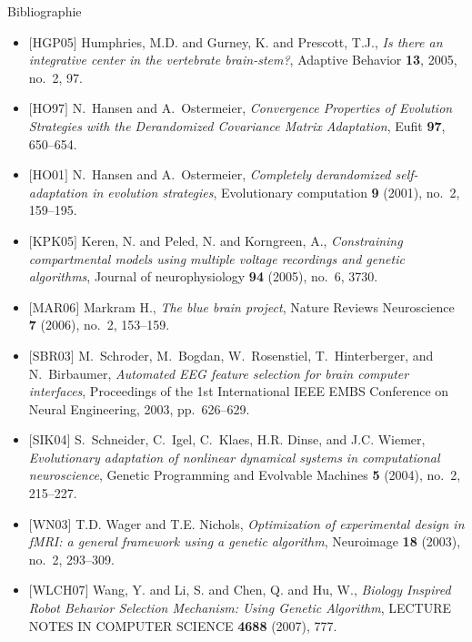 \documentclass{beamer}
\begin{document}
\begin{frame}[allowframebreaks]{Bibliographie}
\begin{itemize}
        \item $[$HGP05$]$
        Humphries, M.D. and Gurney, K. and Prescott, T.J.,
        \emph{{Is there an integrative center in the vertebrate brain-stem?}},
        Adaptive Behavior \textbf{13}, 2005, no.~2, 97.

        \item $[$HO97$]$
        N.~Hansen and A.~Ostermeier,
        \emph{{Convergence Properties of Evolution Strategies with the
        Derandomized Covariance Matrix Adaptation}},
        Eufit \textbf{97}, 650--654.

        \item $[$HO01$]$
        N.~Hansen and A.~Ostermeier,
        \emph{{Completely derandomized self-adaptation in evolution
        strategies}},
        Evolutionary computation \textbf{9} (2001), no.~2, 159--195.

        \item $[$KPK05$]$
        Keren, N. and Peled, N. and Korngreen, A.,
        \emph{{Constraining compartmental models using multiple voltage
        recordings and genetic algorithms}},
        Journal of neurophysiology \textbf{94} (2005), no.~6, 3730.

        \item $[$MAR06$]$
        Markram H., \emph{{The blue brain project}},
        Nature Reviews Neuroscience \textbf{7} (2006), no.~2, 153--159.

        \item $[$SBR03$]$
        M.~Schroder, M.~Bogdan, W.~Rosenstiel, T.~Hinterberger, and
        N.~Birbaumer,
        \emph{{Automated EEG feature selection for brain computer interfaces}},
        Proceedings of the 1st International IEEE EMBS Conference on Neural
        Engineering, 2003, pp.~626--629.

        \item $[$SIK04$]$
        S.~Schneider, C.~Igel, C.~Klaes, H.R. Dinse, and J.C. Wiemer,
        \emph{{Evolutionary adaptation of nonlinear dynamical systems in
        computational neuroscience}},
        Genetic Programming and Evolvable Machines \textbf{5} (2004),
        no.~2, 215--227.

        \item $[$WN03$]$
        T.D. Wager and T.E. Nichols,
        \emph{{Optimization of experimental design in fMRI: a general
        framework using a genetic algorithm}},
        Neuroimage \textbf{18} (2003), no.~2, 293--309.

        \item $[$WLCH07$]$
        Wang, Y. and Li, S. and Chen, Q. and Hu, W.,
        \emph{{Biology Inspired Robot Behavior Selection Mechanism:
        Using Genetic Algorithm}},
        LECTURE NOTES IN COMPUTER SCIENCE \textbf{4688}
        (2007), 777.


\end{itemize}
\end{frame}
\end{document}
